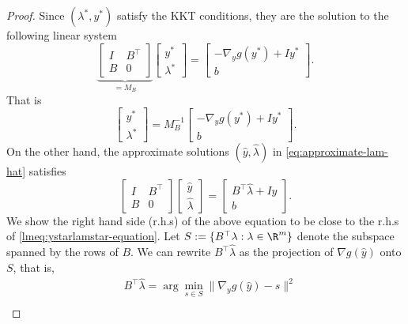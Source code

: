 \begin{proof}
    Since $(\lambda^*,y^*)$ satisfy the KKT conditions, they are the solution to the following linear system 
    \begin{equation}\label{lmeq:ystarlamstar-equation}
        \underbrace{\begin{bmatrix}I & B^\top\\ B & 0 \end{bmatrix}}_{=M_B} 
    \begin{bmatrix} y^* \\ \lambda^*\end{bmatrix}
    =\begin{bmatrix}-\nabla_y g(y^*) + I y^* \\ b\end{bmatrix}.
    \end{equation}
    That is %
    $$ \begin{bmatrix} y^* \\ \lambda^*\end{bmatrix}
    =M_B^{-1}\begin{bmatrix}-\nabla_y g(y^*) + I y^* \\ b\end{bmatrix}.
    $$
    On the other hand, the approximate solutions $(\hat{y}, \hat{\lambda})$ in \cref{eq:approximate-lam-hat} satisfies %
        $$\begin{bmatrix}I & B^\top\\ B & 0 \end{bmatrix}
    \begin{bmatrix} \hat{y} \\ \hat{\lambda}\end{bmatrix}
    =\begin{bmatrix} B^\top \hat{\lambda} + I \hat{y} \\ b\end{bmatrix}.$$
    We show the right hand side (r.h.s) of the above equation to be close to the r.h.s of \cref{lmeq:ystarlamstar-equation}. Let $S:=\{B^\top \lambda: \lambda\in \R^m\}$ denote the subspace spanned by the rows of $B$. We can rewrite $B^\top \hat\lambda$ as the projection of $\nabla g(\hat y)$ onto $S$, that is, 
    \begin{align*}
        &B^\top \hat \lambda = \arg\min_{s\in S}\|\nabla_y g(\hat y) -s\|^2\\

\end{align*}
\end{proof}

